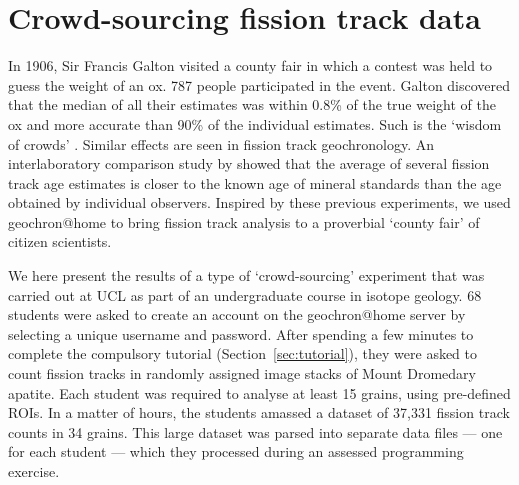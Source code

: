 \documentclass[gchron, manuscript]{copernicus}
\begin{document}
\section{Crowd-sourcing fission track data}\label{sec:crowdsourcing}

In 1906, Sir Francis Galton visited a county fair in which a contest
was held to guess the weight of an ox. 787 people participated in the
event. Galton discovered that the median of all their estimates was
within 0.8\% of the true weight of the ox and more accurate than 90\%
of the individual estimates. Such is the `wisdom of crowds'
\citep{galton1907a}. Similar effects are seen in fission track
geochronology. An interlaboratory comparison study by
\citet{miller1985} showed that the average of several fission track
age estimates is closer to the known age of mineral standards than the
age obtained by individual observers. Inspired by these previous
experiments, we used geochron@home to bring fission track analysis to
a proverbial `county fair' of citizen scientists.\medskip

We here present the results of a type of `crowd-sourcing' experiment
that was carried out at UCL as part of an undergraduate course in
isotope geology. 68 students were asked to create an account on the
geochron@home server by selecting a unique username and
password. After spending a few minutes to complete the compulsory
tutorial (Section~\ref{sec:tutorial}), they were asked to count
fission tracks in randomly assigned image stacks of Mount Dromedary
apatite. Each student was required to analyse at least 15 grains,
using pre-defined ROIs. In a matter of hours, the students amassed a
dataset of 37,331 fission track counts in 34 grains.  This large
dataset was parsed into separate data files --- one for each student
--- which they processed during an assessed programming
exercise.\medskip

\begin{small}
  \\
\end{small}
\label{tab:crowdtable}
\end{document}
